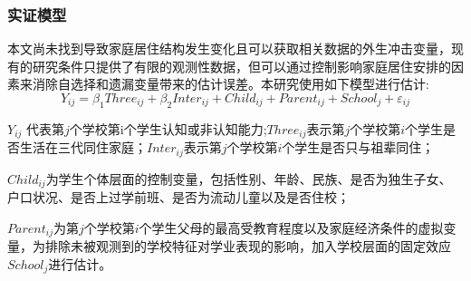 \documentclass{beamer}
\begin{document}
\begin{frame}
	\frametitle{实证模型}
	本文尚未找到导致家庭居住结构发生变化且可以获取相关数据的外生冲击变量，现有的研究条件只提供了有限的观测性数据，但可以通过控制影响家庭居住安排的因素来消除自选择和遗漏变量带来的估计误差。本研究使用如下模型进行估计:
\begin{equation}
	Y_{ij}=\beta_1Three_{ij}+\beta_2Inter_{ij}+Child_{ij}+Parent_{ij}+School_j+\varepsilon_{ij}
\end{equation}
\par $Y_{ij}$ 代表第$j$个学校第i个学生认知或非认知能力;$Three_{ij}$表示第$j$个学校第$i$个学生是否生活在三代同住家庭；$Inter_{ij}$表示第$j$个学校第$i$个学生是否只与祖辈同住；
\par $Child_{ij}$为学生个体层面的控制变量，包括性别、年龄、民族、是否为独生子女、户口状况、是否上过学前班、是否为流动儿童以及是否住校；
\par $Parent_{ij}$为第$j$个学校第$i$个学生父母的最高受教育程度以及家庭经济条件的虚拟变量，为排除未被观测到的学校特征对学业表现的影响，加入学校层面的固定效应$School_j$进行估计。 
\end{frame}
\end{document}
